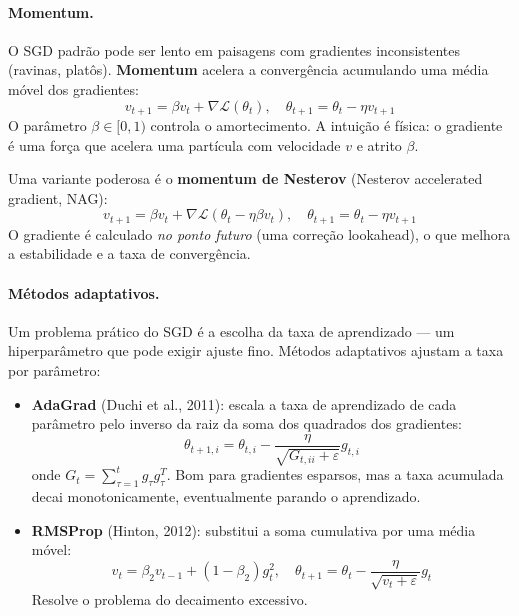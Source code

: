 \documentclass{tufte-handout}
\begin{document}
\paragraph{Momentum.}

O SGD padrão pode ser lento em paisagens com gradientes inconsistentes (ravinas,
platôs). \textbf{Momentum} acelera a convergência acumulando uma média móvel dos
gradientes:
\[
v_{t+1} = \beta v_t + \nabla \mathcal{L}(\theta_t), \quad
\theta_{t+1} = \theta_t - \eta v_{t+1}
\]
O parâmetro $\beta \in [0, 1)$ controla o amortecimento. A intuição é física: o
gradiente é uma força que acelera uma partícula com velocidade $v$ e atrito $\beta$.

Uma variante poderosa é o \textbf{momentum de Nesterov} (Nesterov accelerated
gradient, NAG):
\[
v_{t+1} = \beta v_t + \nabla \mathcal{L}(\theta_t - \eta \beta v_t), \quad
\theta_{t+1} = \theta_t - \eta v_{t+1}
\]
O gradiente é calculado \textit{no ponto futuro} (uma correção lookahead), o que
melhora a estabilidade e a taxa de convergência.

\paragraph{Métodos adaptativos.}

Um problema prático do SGD é a escolha da taxa de aprendizado --- um hiperparâmetro
que pode exigir ajuste fino. Métodos adaptativos ajustam a taxa por parâmetro:

\begin{itemize}
    \item \textbf{AdaGrad} (Duchi et al., 2011): escala a taxa de aprendizado de
    cada parâmetro pelo inverso da raiz da soma dos quadrados dos gradientes:
    \[
    \theta_{t+1, i} = \theta_{t,i} - \frac{\eta}{\sqrt{G_{t,ii} + \varepsilon}} g_{t,i}
    \]
    onde $G_t = \sum_{\tau=1}^t g_\tau g_\tau^T$. Bom para gradientes esparsos, mas
    a taxa acumulada decai monotonicamente, eventualmente parando o aprendizado.

    \item \textbf{RMSProp} (Hinton, 2012): substitui a soma cumulativa por uma média
    móvel:
    \[
    v_t = \beta_2 v_{t-1} + (1 - \beta_2) g_t^2, \quad
    \theta_{t+1} = \theta_t - \frac{\eta}{\sqrt{v_t + \varepsilon}} g_t
    \]
    Resolve o problema do decaimento excessivo.
\end{itemize}
\end{document}
